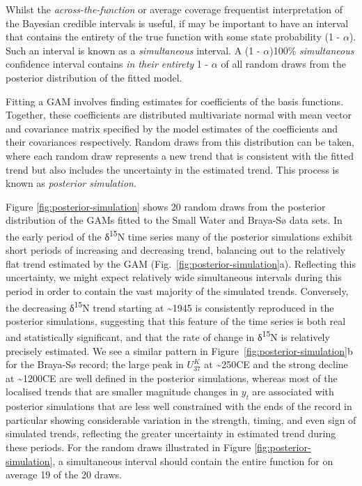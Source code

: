 \documentclass[12pt,]{article}
\newcommand{\uk}{\ensuremath{\mathit{U}^{\mathit{K}}_{\mathup{37}}}}
\begin{document}
Whilst the \emph{across-the-function} or average coverage frequentist
interpretation of the Bayesian credible intervals is useful, if may be
important to have an interval that contains the entirety of the true
function with some state probability (1 - \(\alpha\)). Such an interval
is known as a \emph{simultaneous} interval. A (1 - \(\alpha\))100\%
\emph{simultaneous} confidence interval contains \emph{in their
entirety} 1 - \(\alpha\) of all random draws from the posterior
distribution of the fitted model.

Fitting a GAM involves finding estimates for coefficients of the basis
functions. Together, these coefficients are distributed multivariate
normal with mean vector and covariance matrix specified by the model
estimates of the coefficients and their covariances respectively. Random
draws from this distribution can be taken, where each random draw
represents a new trend that is consistent with the fitted trend but also
includes the uncertainty in the estimated trend. This process is known
as \emph{posterior simulation}.

Figure \ref{fig:posterior-simulation} shows 20 random draws from the
posterior distribution of the GAMs fitted to the Small Water and
Braya-Sø data sets. In the early period of the δ\textsuperscript{15}N
time series many of the posterior simulations exhibit short periods of
increasing and decreasing trend, balancing out to the relatively flat
trend estimated by the GAM (Fig.~\ref{fig:posterior-simulation}a).
Reflecting this uncertainty, we might expect relatively wide
simultaneous intervals during this period in order to contain the vast
majority of the simulated trends. Conversely, the decreasing
δ\textsuperscript{15}N trend starting at \textasciitilde{}1945 is
consistently reproduced in the posterior simulations, suggesting that
this feature of the time series is both real and statistically
significant, and that the rate of change in δ\textsuperscript{15}N is
relatively precisely estimated. We see a similar pattern in
Figure~\ref{fig:posterior-simulation}b for the Braya-Sø record; the
large peak in \uk{} at \textasciitilde{}250CE and the strong decline at
\textasciitilde{}1200CE are well defined in the posterior simulations,
whereas most of the localised trends that are smaller magnitude changes
in \(y_t\) are associated with posterior simulations that are less well
constrained with the ends of the record in particular showing
considerable variation in the strength, timing, and even sign of
simulated trends, reflecting the greater uncertainty in estimated trend
during these periods. For the random draws illustrated in Figure
\ref{fig:posterior-simulation}, a simultaneous interval should contain
the entire function for on average 19 of the 20 draws.
\end{document}
